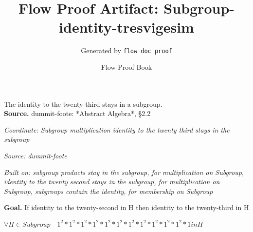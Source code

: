 \documentclass[11pt]{article}
\title{Flow Proof Artifact: Subgroup-identity-tresvigesim}
\author{Generated by \texttt{flow doc proof}}
\date{Flow Proof Book}
\theoremstyle{definition}
\begin{document}
\maketitle
The identity to the twenty-third stays in a subgroup.\\[0.5em]
\textbf{Source.} dummit-foote: *Abstract Algebra*, §2.2\\[0.5em]
\bigskip
{}\par
\smallskip\noindent\textit{Coordinate: Subgroup \cdot multiplication \cdot identity to the twenty third stays in the subgroup}\par
\smallskip\noindent\textit{Source: dummit-foote}\par
\smallskip\noindent\textit{Built on: subgroup products stay in the subgroup, for multiplication on Subgroup, identity to the twenty second stays in the subgroup, for multiplication on Subgroup, subgroups contain the identity, for membership on Subgroup}\par
\medskip
\noindent\textbf{Goal.} If identity to the twenty-second in H then identity to the twenty-third in H\par
\noindent$\displaystyle \forall H \in Subgroup\quad 1^{2} * 1^{2} * 1^{2} * 1^{2} * 1^{2} * 1^{2} * 1^{2} * 1^{2} * 1^{2} * 1^{2} * 1^{2} * 1 in H$\par
\medskip
\noindent
\end{document}
